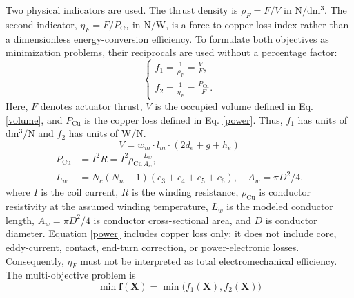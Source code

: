 \par Two physical indicators are used. The thrust density is $\rho_F=F/V$ in $\mathrm{N/dm^3}$. The second indicator, $\eta_F=F/P_{\mathrm{Cu}}$ in $\mathrm{N/W}$, is a force-to-copper-loss index rather than a dimensionless energy-conversion efficiency. To formulate both objectives as minimization problems, their reciprocals are used without a percentage factor:
\begin{equation}
	\left\{ \begin{array}{l}
		f_1=\frac{1}{\rho_F}=\frac{V}{F}, \\
		f_2=\frac{1}{\eta_F}=\frac{P_{\mathrm{Cu}}}{F}.
	\end{array} \right.
\end{equation}
Here, $F$ denotes actuator thrust, $V$ is the occupied volume defined in Eq. \ref{volume}, and $P_{\mathrm{Cu}}$ is the copper loss defined in Eq. \ref{power}. Thus, $f_1$ has units of $\mathrm{dm^3/N}$ and $f_2$ has units of $\mathrm{W/N}$.
\begin{equation}
	V=w_m\cdot l_m\cdot (2d_e+g+h_e)
	\label{volume}
\end{equation}
\begin{equation}
\begin{aligned}
	P_{\mathrm{Cu}}&=I^2R=I^2\rho_{\mathrm{Cu}}\frac{L_w}{A_w},\\
	L_w&=N_c(N_n-1)(c_3+c_4+c_5+c_6),\quad A_w=\pi D^2/4.
\end{aligned}
	\label{power}
\end{equation}
where $I$ is the coil current, $R$ is the winding resistance, $\rho_{\mathrm{Cu}}$ is conductor resistivity at the assumed winding temperature, $L_w$ is the modeled conductor length, $A_w=\pi D^2/4$ is conductor cross-sectional area, and $D$ is conductor diameter. Equation \ref{power} includes copper loss only; it does not include core, eddy-current, contact, end-turn correction, or power-electronic losses. Consequently, $\eta_F$ must not be interpreted as total electromechanical efficiency. The multi-objective problem is
\begin{equation}
	\min \bm{f}(\bm{X}) = \min\bigl(f_1(\bm{X}), f_2(\bm{X})\bigr)
\end{equation}
